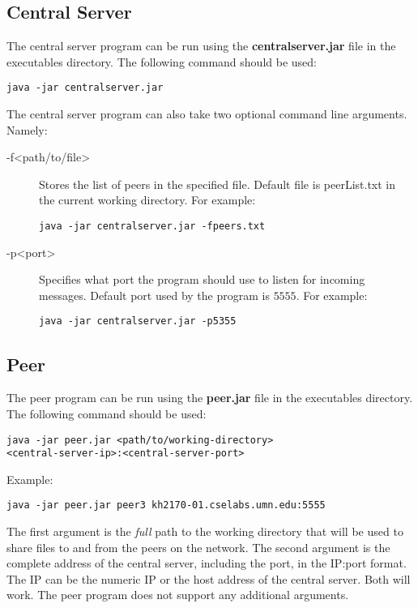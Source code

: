 \documentclass[12pt,twosided,a4paper]{article}
\numberwithin{equation}{section} %
\numberwithin{figure}{section} %
\numberwithin{table}{section} %
\begin{document}
\subsection{Central Server}
The central server program can be run using the \textbf{centralserver.jar} file
in the executables directory.
The following command should be used:
\begin{lstlisting}
java -jar centralserver.jar
\end{lstlisting}
The central server program can also take two optional command line arguments.
Namely:
\begin{description}
\item[-f<path/to/file>] Stores the list of peers in the specified file. Default
file is peerList.txt in the current working directory. For example:
\begin{lstlisting}
java -jar centralserver.jar -fpeers.txt
\end{lstlisting}
\item[-p<port>] Specifies what port the program should use to listen for
incoming messages. Default port used by the program is $5555$. For example:
\begin{lstlisting}
java -jar centralserver.jar -p5355
\end{lstlisting}
\end{description}

\subsection{Peer}
The peer program can be run using the \textbf{peer.jar} file in the executables
directory.
The following command should be used:
\begin{lstlisting}
java -jar peer.jar <path/to/working-directory>
<central-server-ip>:<central-server-port>
\end{lstlisting}
Example:
\begin{lstlisting}
java -jar peer.jar peer3 kh2170-01.cselabs.umn.edu:5555
\end{lstlisting}
The first argument is the \emph{full} path to the working directory that will be
used to share files to and from the peers on the network.
The second argument is the complete address of the central server, including the
port, in the IP:port format. The IP can be the numeric IP or the host address of
the central server. Both will work. The peer program does not support any
additional arguments.
\end{document}
